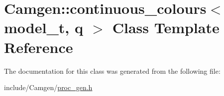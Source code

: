 \hypertarget{a00103}{}\section{Camgen\+:\+:continuous\+\_\+colours$<$ model\+\_\+t, q $>$ Class Template Reference}
\label{a00103}


The documentation for this class was generated from the following file\+:\begin{DoxyCompactItemize}
\item 
include/\+Camgen/\hyperlink{a00730}{proc\+\_\+gen.\+h}\end{DoxyCompactItemize}
